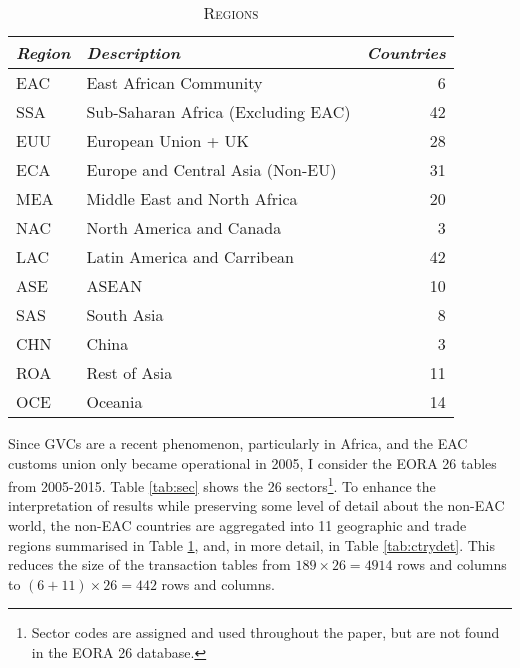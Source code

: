 \documentclass[a4paper]{article}
\begin{document}
\begin{table}[h!]
\centering
\caption{\textsc{Regions}}

\label{tab:ctry}
\vspace{2mm}
\begin{tabular}{llr} \toprule
\textit{Region} & \textit{Description} & \textit{Countries} \\ \midrule
EAC & East African Community & 6 \\
SSA & Sub-Saharan Africa (Excluding EAC) & 42 \\
EUU & European Union + UK & 28 \\
ECA & Europe and Central Asia (Non-EU) & 31 \\
MEA & Middle East and North Africa & 20 \\
NAC & North America and Canada & 3\\
LAC & Latin America and Carribean & 42 \\
ASE & ASEAN & 10 \\
SAS & South Asia & 8 \\
CHN & China & 3 \\
ROA & Rest of Asia & 11 \\
OCE & Oceania & 14
 \\ \bottomrule
\end{tabular}
\end{table}
\FloatBarrier

Since GVCs are a recent phenomenon, particularly in Africa, and the EAC customs union only became operational in 2005, I consider the EORA 26 tables from 2005-2015.  Table \ref{tab:sec} shows the 26 sectors\footnote{Sector codes are assigned and used throughout the paper, but are not found in the EORA 26 database.}. To enhance the interpretation of results while preserving some level of detail about the non-EAC world, the non-EAC countries are aggregated into 11 geographic and trade regions summarised in Table \ref{tab:ctry}, and, in more detail, in Table \ref{tab:ctrydet}. This reduces the size of the transaction tables from $189 \times 26 = 4914$ rows and columns to $(6 + 11)\times 26 = 442$ rows and columns. 
\end{document}
